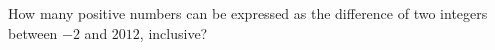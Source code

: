 How many positive numbers can be expressed as the difference of two integers between $-2$ and $2012$, inclusive?
